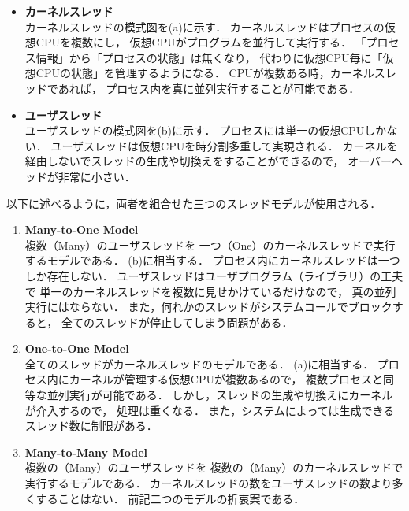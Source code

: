 \begin{itemize}
\item {\bf カーネルスレッド} \\
カーネルスレッドの模式図を(a)に示す．
カーネルスレッドはプロセスの仮想CPUを複数にし，
仮想CPUがプログラムを並行して実行する．
「プロセス情報」から「プロセスの状態」は無くなり，
代わりに仮想CPU毎に「仮想CPUの状態」を管理するようになる．
CPUが複数ある時，カーネルスレッドであれば，
プロセス内を真に並列実行することが可能である．

\item {\bf ユーザスレッド} \\
ユーザスレッドの模式図を(b)に示す．
プロセスには単一の仮想CPUしかない．
ユーザスレッドは仮想CPUを時分割多重して実現される．
カーネルを経由しないでスレッドの生成や切換えをすることができるので，
オーバーヘッドが非常に小さい．
\end{itemize}

以下に述べるように，両者を組合せた三つのスレッドモデルが使用される．

\begin{enumerate}
\item {\bf Many-to-One Model} \\
複数（Many）のユーザスレッドを
一つ（One）のカーネルスレッドで実行するモデルである．
(b)に相当する．
プロセス内にカーネルスレッドは一つしか存在しない．
ユーザスレッドはユーザプログラム（ライブラリ）の工夫で
単一のカーネルスレッドを複数に見せかけているだけなので，
真の並列実行にはならない．
また，何れかのスレッドがシステムコールでブロックすると，
全てのスレッドが停止してしまう問題がある．

\item {\bf One-to-One Model} \\
全てのスレッドがカーネルスレッドのモデルである．
(a)に相当する．
プロセス内にカーネルが管理する仮想CPUが複数あるので，
複数プロセスと同等な並列実行が可能である．
しかし，スレッドの生成や切換えにカーネルが介入するので，
処理は重くなる．
また，システムによっては生成できるスレッド数に制限がある．

\item {\bf Many-to-Many Model} \\
複数の（Many）のユーザスレッドを
複数の（Many）のカーネルスレッドで実行するモデルである．
カーネルスレッドの数をユーザスレッドの数より多くすることはない．
前記二つのモデルの折衷案である．
\end{enumerate}

